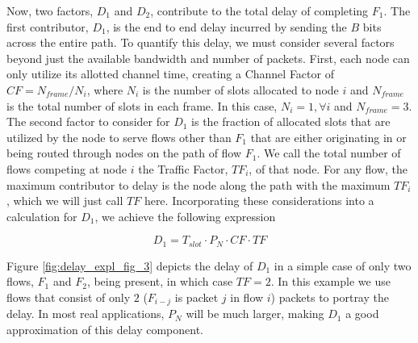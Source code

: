 Now, two factors, $D_1$ and $D_2$, contribute to the total delay of completing $F_1$.  The first contributor, $D_1$, is the end to end delay incurred by sending the $B$ bits across the entire path.  To quantify this delay, we must consider several factors beyond just the available bandwidth and number of packets.  First, each node can only utilize its allotted channel time, creating a Channel Factor of $CF = N_{frame}/N_{i}$, where $N_{i}$ is the number of slots allocated to node $i$ and $N_{frame}$ is the total number of slots in each frame.  In this case, $N_{i} = 1, \forall i$ and $N_{frame} = 3$.  The second factor to consider for $D_1$ is the fraction of allocated slots that are utilized by the node to serve flows other than $F_1$ that are either originating in or being routed through nodes on the path of flow $F_1$.  We call the total number of flows competing at node $i$ the Traffic Factor, $TF_i$, of that node.  For any flow, the maximum contributor to delay is the node along the path with the maximum $TF_i$, which we will just call $TF$ here.  Incorporating these considerations into a calculation for $D_1$, we achieve the following expression


\begin{equation}
	D_1 = T_{slot} \cdot P_N \cdot CF \cdot TF
\end{equation}

Figure \ref{fig:delay_expl_fig_3} depicts the delay of $D_1$ in a simple case of only two flows, $F_1$ and $F_2$, being present, in which case $TF = 2$.  In this example we use flows that consist of only $2$ ($F_{i-j}$ is packet $j$ in flow $i$) packets to portray the delay.  In most real applications, $P_N$ will be much larger, making $D_1$ a good approximation of this delay component.


